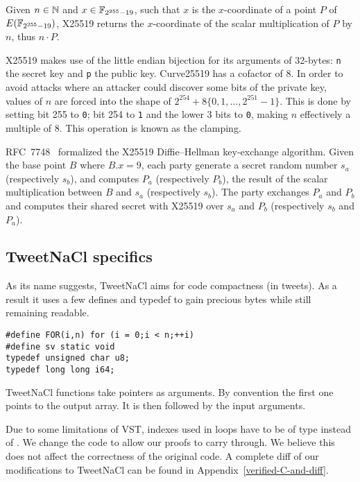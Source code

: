 Given $n \in \mathbb{N}$ and $x \in \mathbb{F}_{2^{255}-19}$, such that $x$ is the $x$-coordinate of
a point $P$ of $E(\mathbb{F}_{2^{255}-19})$, X25519 returns the $x$-coordinate of the
scalar multiplication of $P$ by $n$, thus $n \cdot P$.

X25519 makes use of the little endian bijection for its arguments of 32-bytes:
\texttt{n} the secret key and \texttt{p} the public key.
Curve25519 has a cofactor of 8. In order to avoid attacks where an attacker
could discover some bits of the private key, values of $n$ are forced into the
shape of $2^{254} + 8\{0,1,\ldots,2^{251}-1\}$. This is done by setting bit 255
to \texttt{0}; bit 254 to \texttt{1} and the lower 3 bits to \texttt{0},
making $n$ effectively a multiple of 8. This operation is known as the clamping.

RFC~7748~\cite{rfc7748} formalized the X25519 Diffie–Hellman key-exchange algorithm.
Given the base point $B$ where $B.x=9$, each party generate a secret random number
$s_a$ (respectively $s_b$), and computes $P_a$ (respectively $P_b$), the result
of the scalar multiplication between $B$ and $s_a$ (respectively $s_b$).
The party exchanges $P_a$ and $P_b$ and computes their shared secret with X25519
over $s_a$ and $P_b$ (respectively $s_b$ and $P_a$).





\subsection{TweetNaCl specifics}
\label{subsec:Number-TweetNaCl}

As its name suggests, TweetNaCl aims for code compactness (in tweets).
As a result it uses a few defines and typedef to gain precious bytes while
still remaining readable.
\begin{lstlisting}[language=Ctweetnacl]
#define FOR(i,n) for (i = 0;i < n;++i)
#define sv static void
typedef unsigned char u8;
typedef long long i64;
\end{lstlisting}

TweetNaCl functions take pointers as arguments. By convention the first one
points to the output array. It is then followed by the input arguments.

Due to some limitations of VST, indexes used in  loops have to be
of type  instead of . We change the code to allow our
proofs to carry through. We believe this does not affect the correctness of the
original code. A complete diff of our modifications to TweetNaCl can be found in
Appendix~\ref{verified-C-and-diff}.





